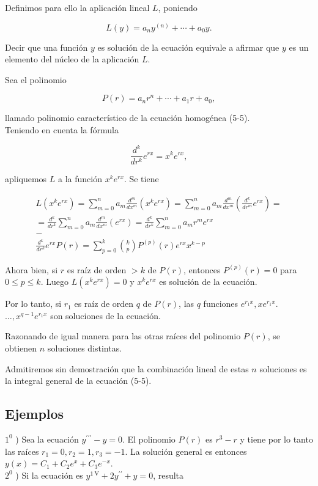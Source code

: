 \documentclass[10pt]{article}
\theoremstyle{plain}
\theoremstyle{definition}
\theoremstyle{remark}
\begin{document}
Definimos para ello la aplicación lineal $L$, poniendo


\begin{equation*}
L(y)=a_{n} y^{(n)}+\cdots+a_{0} y . \tag{5-6}
\end{equation*}


Decir que una función $y$ es solución de la ecuación equivale a afirmar que $y$ es un elemento del núcleo de la aplicación $L$.

Sea el polinomio

$$
P(r)=a_{n} r^{n}+\cdots+a_{1} r+a_{0},
$$

llamado polinomio característico de la ecuación homogénea (5-5).\\
Teniendo en cuenta la fórmula

$$
\frac{d^{k}}{d r^{k}} e^{r x}=x^{k} e^{r x},
$$

apliquemos $L$ a la función $x^{k} e^{r x}$. Se tiene

$$
\begin{gathered}
L\left(x^{k} e^{r x}\right)=\sum_{m=0}^{n} a_{m} \frac{d^{m}}{d x^{m}}\left(x^{k} e^{r x}\right)=\sum_{m=0}^{n} a_{m} \frac{d^{m}}{d x^{m}}\left(\frac{d^{k}}{d r^{m}} e^{r x}\right)= \\
=\frac{d^{k}}{d r^{k}} \sum_{m=0}^{n} a_{m} \frac{d^{m}}{d x^{m}}\left(e^{r x}\right)=\frac{d^{k}}{d r^{k}} \sum_{m=0}^{n} a_{m} r^{m} e^{r x} \\
- \\
\frac{d^{k}}{d r^{k}} e^{r x} P(r)=\sum_{p=0}^{k}\binom{k}{p} P^{(p)}(r) e^{r x} x^{k-p}
\end{gathered}
$$

Ahora bien, si $r$ es raíz de orden $>k$ de $P(r)$, entonces $P^{(p)}(r)=0$ para $0 \leqslant p \leqslant k$. Luego $L\left(x^{k} e^{r x}\right)=0$ y $x^{k} e^{r x}$ es solución de la ecuación.

Por lo tanto, si $r_{1}$ es raíz de orden $q$ de $P(r)$, las $q$ funciones $e^{r_{1} x}, x e^{r_{1} x}$. $\ldots, x^{q-1} e^{r_{1} x}$ son soluciones de la ecuación.

Razonando de igual manera para las otras raíces del polinomio $P(r)$, se obtienen $n$ soluciones distintas.

Admitiremos sin demostración que la combinación lineal de estas $n$ soluciones es la integral general de la ecuación (5-5).

\subsection{Ejemplos}
$1^{0}$ ) Sea la ecuación $y^{\prime \prime \prime}-y=0$. El polinomio $P(r)$ es $r^{3}-r$ y tiene por lo tanto las raíces $r_{1}=0, r_{2}=1, r_{3}=-1$. La solución general es entonces $y(x)=C_{1}+C_{2} e^{x}+C_{3} e^{-x}$.\\
$2^{0}$ ) Si la ecuación es $y^{1 \mathrm{~V}}+2 y^{\prime \prime}+y=0$, resulta
\end{document}
